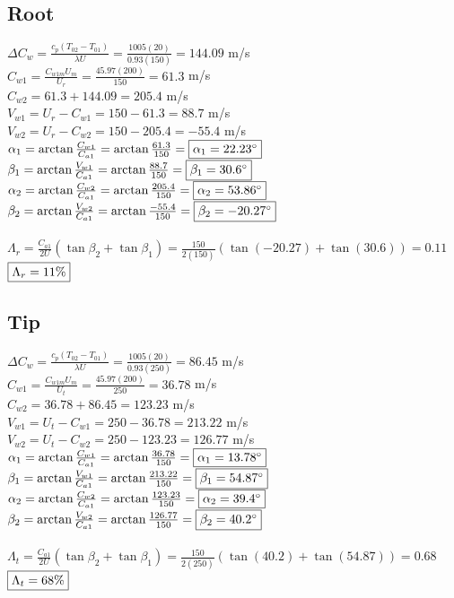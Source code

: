 \documentclass{article}
\begin{document}
\subsection*{Root}
$\Delta C_w=\frac{c_p(T_{02}-T_{01})}{\lambda U}=\frac{1005(20)}{0.93(150)}=
144.09$ m/s \\
$C_{w1}=\frac{C_{w1m}U_{m}}{U_{r}}=\frac{45.97(200)}{150}=61.3$ m/s \\
$C_{w2}=61.3+144.09=205.4$ m/s \\
$V_{w1}=U_r-C_{w1}=150-61.3=88.7$ m/s \\
$V_{w2}=U_r-C_{w2}=150-205.4=-55.4$ m/s \\
$\alpha_1=\arctan\frac{C_{w1}}{C_{a1}}=\arctan\frac{61.3}{150}=
\fbox{$\alpha_1=22.23^\circ$}$ \\
$\beta_1=\arctan\frac{V_{w1}}{C_{a1}}=\arctan\frac{88.7}{150}=
\fbox{$\beta_1=30.6^\circ$}$ \\
$\alpha_2=\arctan\frac{C_{w2}}{C_{a1}}=\arctan\frac{205.4}{150}=
\fbox{$\alpha_2=53.86^\circ$}$ \\
$\beta_2=\arctan\frac{V_{w2}}{C_{a1}}=\arctan\frac{-55.4}{150}=
\fbox{$\beta_2=-20.27^\circ$}$ \\\\
$\Lambda_r=\frac{C_{a1}}{2U}(\tan\beta_2+\tan\beta_1)=\frac{150}{2(150)}
(\tan(-20.27)+\tan(30.6))=0.11$ \\
$\fbox{$\Lambda_r=11$\%}$

\subsection*{Tip}
$\Delta C_w=\frac{c_p(T_{02}-T_{01})}{\lambda U}=\frac{1005(20)}{0.93(250)}=
86.45$ m/s \\
$C_{w1}=\frac{C_{w1m}U_{m}}{U_{t}}=\frac{45.97(200)}{250}=36.78$ m/s \\
$C_{w2}=36.78+86.45=123.23$ m/s \\
$V_{w1}=U_t-C_{w1}=250-36.78=213.22$ m/s \\
$V_{w2}=U_t-C_{w2}=250-123.23=126.77$ m/s \\
$\alpha_1=\arctan\frac{C_{w1}}{C_{a1}}=\arctan\frac{36.78}{150}=
\fbox{$\alpha_1=13.78^\circ$}$ \\
$\beta_1=\arctan\frac{V_{w1}}{C_{a1}}=\arctan\frac{213.22}{150}=
\fbox{$\beta_1=54.87^\circ$}$ \\
$\alpha_2=\arctan\frac{C_{w2}}{C_{a1}}=\arctan\frac{123.23}{150}=
\fbox{$\alpha_2=39.4^\circ$}$ \\
$\beta_2=\arctan\frac{V_{w2}}{C_{a1}}=\arctan\frac{126.77}{150}=
\fbox{$\beta_2=40.2^\circ$}$ \\\\
$\Lambda_t=\frac{C_{a1}}{2U}(\tan\beta_2+\tan\beta_1)=\frac{150}{2(250)}
(\tan(40.2)+\tan(54.87))=0.68$ \\
$\fbox{$\Lambda_t=68$\%}$
\end{document}
